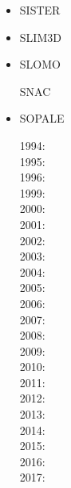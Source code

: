 \begin{itemize}
\item SISTER

\cite{olbm16}

\item SLIM3D

\cite{poso08}
\cite{qusp10}
\cite{brps12}
\cite{brps13}
\cite{brau13}
\cite{brun14}
\cite{hebr14}
\cite{kobf14}
\cite{clbq15}
\cite{brcr17}
\cite{basq18}

\item SLOMO
\cite{kaus05}

\index SNAC
\cite{chlg08}


\item SOPALE

1994: \cite{wibe94}\cite{befh94}\\
1995: \cite{full95}\cite{elfb95}\\
1996: \cite{bekh96}\\
1999: \cite{will99a}\cite{will99b}\\
2000: \cite{pybf00}\cite{bemh00}\\
2001: \cite{bejn01}\\
2002: \cite{hube02}\cite{pybf02}\\
2003: \cite{hube03}\cite{vamf03}\cite{wipo03}\cite{pymi03}\\
2004: \cite{bejn04}\cite{pycr04}\cite{pybe04}\cite{elsp04}\cite{geim04}\\
2005: \cite{gebi05}\cite{hubb05}\\
2006: \cite{pysk06}\cite{selz06}\\
2007: \cite{hube07}\cite{cubh07}\cite{mohb07}\\
2008: \cite{sebp08}\cite{wabj08}\cite{wabj08b}\cite{gopy08}\\
2009: \cite{kecw09}\cite{bejb09}\cite{bupb09}\cite{grba09}\cite{sihb09}\\
2010: \cite{albs10}\cite{albe10}\cite{grpy10}\cite{pygp10}\\
2011: \cite{cube11}\cite{bubj11}\cite{hube11}\\
2012: \cite{grpy12}\cite{grpy12b}\cite{kogp12}\cite{grbe12}\cite{jahu12}\\
2013: \cite{bubj13}\cite{chbe13}\cite{fihv13a}\cite{fihv13b}\cite{gobi13}\cite{grpy13}\cite{knak13}\cite{nipc13}\cite{jahm13}\\
2014: \cite{gogu14}\\
2015: \cite{albe15}\cite{bubj15}\cite{heps15}\\
2016: \cite{licu16}\\
2017: \cite{bube17}



\end{itemize}
